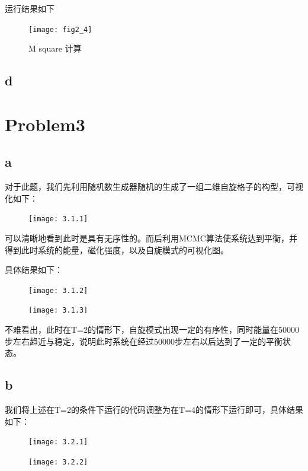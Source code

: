 \documentclass[UTF8]{ctexart}
\begin{document}
    运行结果如下
    \begin{figure}[h]
        \centering
        \texttt{[image: fig2\_4]}
        \caption{M square 计算}\label{fig:2.4}
    \end{figure}
    \subsection{d}\label{subsec:2.4}

    \newpage
    \section{Problem3}\label{sec:3}
    \subsection{a}\label{subsec:3.1}
    对于此题，我们先利用随机数生成器随机的生成了一组二维自旋格子的构型，可视化如下：
    \begin{figure}[h]
        \centering
        \texttt{[image: 3.1.1]}
        \label{fig:3.1.1}
    \end{figure}

    可以清晰地看到此时是具有无序性的。而后利用MCMC算法使系统达到平衡，并得到此时系统的能量，磁化强度，以及自旋模式的可视化图。

    具体结果如下：
    \begin{figure}[h]
        \centering
        \texttt{[image: 3.1.2]}
        \label{fig:3.1.2}
    \end{figure}
    \begin{figure}[h]
        \centering
        \texttt{[image: 3.1.3]}
        \label{fig:3.1.3}
    \end{figure}

    不难看出，此时在T=2的情形下，自旋模式出现一定的有序性，同时能量在50000步左右趋近与稳定，说明此时系统在经过50000步左右以后达到了一定的平衡状态。

    \subsection{b}\label{subsec:3.2}
    我们将上述在T=2的条件下运行的代码调整为在T=4的情形下运行即可，具体结果如下：
    \begin{figure}[h]
        \centering
        \texttt{[image: 3.2.1]}
        \label{fig:3.2.1}
    \end{figure}
    \begin{figure}[h]
        \centering
        \texttt{[image: 3.2.2]}
        \label{fig:3.2.2}
    \end{figure}
\end{document}
